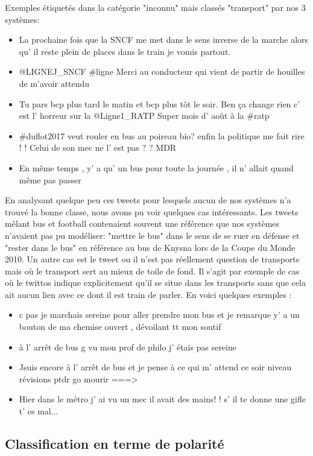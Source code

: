 Exemples étiquetés dans la catégorie "inconnu" mais classés "transport" par nos 3 systèmes:
\begin{itemize}
\item La prochaine fois que la SNCF me met dans le sens inverse de la marche alors qu' il reste plein de places dans le train je vomis partout.
\item @LIGNEJ\_SNCF \#ligne Merci au conducteur qui vient de partir de houilles de m'avoir attendu 
\item Tu pars bcp plus tard le matin et bcp plus tôt le soir. Ben ça change rien c' est l' horreur sur la @Ligne1\_RATP Super mois d' août à la \#ratp
\item \#duflot2017  veut rouler en bus au poireau bio?  enfin la politique me fait rire ! ! Celui de son mec ne l' est pas ? ? MDR
\item En même temps , y' a qu' un bus pour toute la journée , il n' allait quand même pas passer
\end{itemize}

 En analysant quelque peu ces tweets pour lesquels aucun de nos systèmes n'a trouvé la bonne classe, nous avons pu voir quelques cas intéressants.
 Les tweets mêlant bus et football contenaient souvent une référence que nos systèmes n'avaient pas pu modéliser: "mettre le bus" dans le sens de se ruer en défense et "rester dans le bus" en référence au bus de Knysna lors de la Coupe du Monde 2010.
 Un autre cas est le tweet ou il n'est pas réellement question de transports mais où le transport sert au mieux de toile de fond. Il s'agit par exemple de cas où le twittos indique explicitement qu'il se situe dans les transports sans que cela ait aucun lien avec ce dont il est train de parler. En voici quelques exemples :

\begin{itemize}
\item c pas je marchais sereine pour aller prendre mon bus et je remarque y' a un bouton de ma chemise ouvert , dévoilant tt mon soutif
\item à l' arrêt de bus g vu mon prof de philo j' étais pas sereine
\item Jsuis encore à l' arrêt de bus et je pense à ce qui m' attend ce soir niveau révisions ptdr go mourir ===>
\item Hier dans le métro j' ai vu un mec il avait des mains! ! s' il te donne une gifle t' es mal...
\end{itemize}

\subsection{Classification en terme de polarité}


